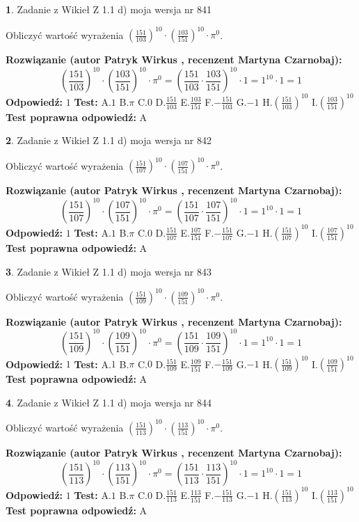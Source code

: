 \documentclass[12pt, a4paper]{article}
\theoremstyle{definition} %
\newtheorem{zad}{}
\newcommand{\zadStart}[1]{\begin{zad}#1\newline}
\newcommand{\zadStop}{\end{zad}}
\newcommand{\rozwStart}[2]{\noindent \textbf{Rozwiązanie (autor #1 , recenzent #2): }\newline}
\newcommand{\rozwStop}{\newline}
\newcommand{\odpStart}{\noindent \textbf{Odpowiedź:}\newline}
\newcommand{\odpStop}{\newline}
\newcommand{\testStart}{\noindent \textbf{Test:}\newline}
\newcommand{\testStop}{\newline}
\newcommand{\kluczStart}{\noindent \textbf{Test poprawna odpowiedź:}\newline}
\newcommand{\kluczStop}{\newline}
\begin{document}
\zadStart{Zadanie z Wikieł Z 1.1 d) moja wersja nr 841}

Obliczyć wartość wyrażenia $(\frac{151}{103})^{10} \cdot (\frac{103}{151})^{10} \cdot \pi^{0}$.
\zadStop
\rozwStart{Patryk Wirkus}{Martyna Czarnobaj}
$$(\frac{151}{103})^{10} \cdot (\frac{103}{151})^{10} \cdot \pi^{0} = (\frac{151}{103} \cdot \frac{103}{151})^{10} \cdot 1 = 1^{10} \cdot 1 = 1$$
\rozwStop
\odpStart
$1$
\odpStop
\testStart
A.$1$ B.$\pi$ C.$0$ D.$\frac{151}{103}$ E.$\frac{103}{151}$
F.$-\frac{151}{103}$ G.$-1$
H.$(\frac{151}{103})^{10}$
I.$(\frac{103}{151})^{10}$
\testStop
\kluczStart
A
\kluczStop



\zadStart{Zadanie z Wikieł Z 1.1 d) moja wersja nr 842}

Obliczyć wartość wyrażenia $(\frac{151}{107})^{10} \cdot (\frac{107}{151})^{10} \cdot \pi^{0}$.
\zadStop
\rozwStart{Patryk Wirkus}{Martyna Czarnobaj}
$$(\frac{151}{107})^{10} \cdot (\frac{107}{151})^{10} \cdot \pi^{0} = (\frac{151}{107} \cdot \frac{107}{151})^{10} \cdot 1 = 1^{10} \cdot 1 = 1$$
\rozwStop
\odpStart
$1$
\odpStop
\testStart
A.$1$ B.$\pi$ C.$0$ D.$\frac{151}{107}$ E.$\frac{107}{151}$
F.$-\frac{151}{107}$ G.$-1$
H.$(\frac{151}{107})^{10}$
I.$(\frac{107}{151})^{10}$
\testStop
\kluczStart
A
\kluczStop



\zadStart{Zadanie z Wikieł Z 1.1 d) moja wersja nr 843}

Obliczyć wartość wyrażenia $(\frac{151}{109})^{10} \cdot (\frac{109}{151})^{10} \cdot \pi^{0}$.
\zadStop
\rozwStart{Patryk Wirkus}{Martyna Czarnobaj}
$$(\frac{151}{109})^{10} \cdot (\frac{109}{151})^{10} \cdot \pi^{0} = (\frac{151}{109} \cdot \frac{109}{151})^{10} \cdot 1 = 1^{10} \cdot 1 = 1$$
\rozwStop
\odpStart
$1$
\odpStop
\testStart
A.$1$ B.$\pi$ C.$0$ D.$\frac{151}{109}$ E.$\frac{109}{151}$
F.$-\frac{151}{109}$ G.$-1$
H.$(\frac{151}{109})^{10}$
I.$(\frac{109}{151})^{10}$
\testStop
\kluczStart
A
\kluczStop



\zadStart{Zadanie z Wikieł Z 1.1 d) moja wersja nr 844}

Obliczyć wartość wyrażenia $(\frac{151}{113})^{10} \cdot (\frac{113}{151})^{10} \cdot \pi^{0}$.
\zadStop
\rozwStart{Patryk Wirkus}{Martyna Czarnobaj}
$$(\frac{151}{113})^{10} \cdot (\frac{113}{151})^{10} \cdot \pi^{0} = (\frac{151}{113} \cdot \frac{113}{151})^{10} \cdot 1 = 1^{10} \cdot 1 = 1$$
\rozwStop
\odpStart
$1$
\odpStop
\testStart
A.$1$ B.$\pi$ C.$0$ D.$\frac{151}{113}$ E.$\frac{113}{151}$
F.$-\frac{151}{113}$ G.$-1$
H.$(\frac{151}{113})^{10}$
I.$(\frac{113}{151})^{10}$
\testStop
\kluczStart
A
\kluczStop
\end{document}
